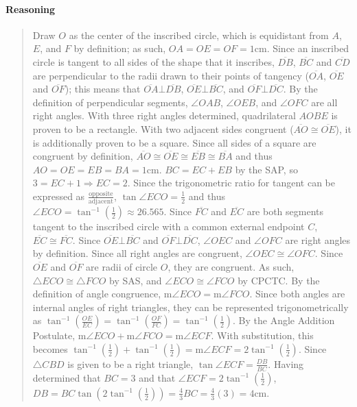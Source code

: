 \documentclass[letterpaper,12pt,twoside]{report}
\begin{document}
	\paragraph{Reasoning}
	\begin{quotation}
		
		Draw $O$ as the center of the inscribed circle, which is equidistant from $A$, $E$, and $F$ by definition; as such, $OA=OE=OF=1 \text{cm}$. Since an inscribed circle is tangent to all sides of the shape that it inscribes, $\overline{DB}$, $\overline{BC}$ and $\overline{CD}$ are perpendicular to the radii drawn to their points of tangency ($\overline{OA}$, $\overline{OE}$ and $\overline{OF}$); this means that $\overline{OA} \bot \overline{DB}$, $\overline{OE} \bot \overline{BC}$, and $\overline{OF} \bot \overline{DC}$. By the definition of perpendicular segments, $\angle OAB$, $\angle OEB$, and $\angle OFC$ are all right angles. With three right angles determined, quadrilateral $AOBE$ is proven to be a rectangle. With two adjacent sides congruent ($\overline{AO} \cong \overline{OE}$), it is additionally proven to be a square. Since all sides of a square are congruent by definition, $\overline{AO}\cong \overline{OE}\cong \overline{EB}\cong \overline{BA}$ and thus $AO=OE=EB=BA=1 \text{cm}$. $BC=EC+EB$ by the SAP, so $3=EC+1 \Rightarrow EC=2$. Since the trigonometric ratio for tangent can be expressed as $\frac{\text{opposite}}{\text{adjacent}}$, $\tan \angle ECO = \frac{1}{2}$ and thus $\angle ECO=\tan^{-1} (\frac{1}{2}) \approx 26.565$\textdegree. Since $\overline{FC}$ and $\overline{EC}$ are both segments tangent to the inscribed circle with a common external endpoint $C$, $\overline{EC}\cong \overline{FC}$. Since $\overline{OE} \bot \overline{BC}$ and $\overline{OF}\bot\overline{DC}$, $\angle OEC$ and $\angle OFC$ are right angles by definition. Since all right angles are congruent, $\angle OEC\cong\angle OFC$. Since $\overline{OE}$ and $\overline{OF}$ are radii of circle $O$, they are congruent. As such, $\triangle ECO \cong \triangle FCO$ by SAS, and $\angle ECO \cong \angle FCO$ by CPCTC. By the definition of angle congruence, $\text{m}\angle ECO = \text{m}\angle FCO$. Since both angles are internal angles of right triangles, they can be represented trigonometrically as $\tan^{-1} (\frac{OE}{EC})=\tan^{-1} (\frac{OF}{FC})=\tan^{-1} (\frac{1}{2})$. By the Angle Addition Postulate, $\text{m}\angle ECO+\text{m}\angle FCO=\text{m}\angle ECF$. With substitution, this becomes $\tan^{-1} (\frac{1}{2}) + \tan^{-1} (\frac{1}{2}) = \text{m}\angle ECF=2\tan^{-1} (\frac{1}{2})$. Since $\triangle CBD$ is given to be a right triangle, $\tan \angle ECF = \frac{DB}{BC}$. Having determined that $BC=3$ and that $\angle ECF=2\tan^{-1} (\frac{1}{2})$, $DB=BC \tan (2 \tan^{-1} (\frac{1}{2}))=\frac{4}{3}BC=\frac{4}{3}(3)=\boxed{4 \text{cm}}$. 
		
	\end{quotation}
	
\end{document}
